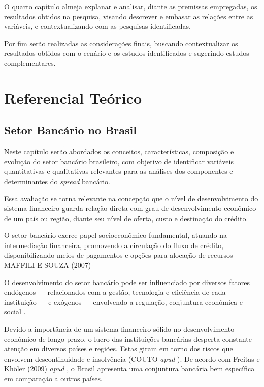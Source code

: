 \documentclass[12pt,12pt,openright,oneside,a4paper,chapter=TITLE,section=TITLE,subsection=TITLE,subsubsection=TITLE english,french,spanish,portugues,sumario=tradicional]{abntex2}
\begin{document}
O quarto capítulo almeja explanar e analisar, diante as premissas empregadas, os resultados obtidos na pesquisa, visando descrever e embasar as relações entre as variáveis, e contextualizando com as pesquisas identificadas.

Por fim serão realizadas as considerações finais, buscando contextualizar os resultados obtidos com o cenário e os estudos identificados e sugerindo estudos complementares.

\textual
\pagestyle{simple}

\chapter{Referencial Teórico}

\section{Setor Bancário no Brasil}

Neste capítulo serão abordados os conceitos, características, composição e
evolução do setor bancário brasileiro, com objetivo de identificar variáveis
quantitativas e qualitativas relevantes para as análises dos componentes e
determinantes do \emph{spread} bancário.

Essa avaliação se torna relevante na concepção que o nível de desenvolvimento
do sistema financeiro guarda relação direta com grau de desenvolvimento
econômico de um país ou região, diante seu nível de oferta, custo e destinação do crédito.

O setor bancário exerce papel socioeconômico fundamental, atuando na
intermediação financeira, promovendo a circulação do fluxo de crédito,
disponibilizando meios de pagamentos e opções para alocação de recursos MAFFILI
E SOUZA (2007)

O desenvolvimento do setor bancário pode ser influenciado por diversos fatores
endógenos --- relacionados com a gestão, tecnologia e eficiência de cada
instituição --- e exógenos --- envolvendo a regulação, conjuntura econômica e
social \cite{rover:2011}.

Devido a importância de um sistema financeiro sólido no desenvolvimento
econômico de longo prazo, o lucro das instituições bancárias desperta constante
atenção em diversos países e regiões. Estas giram em torno dos riscos que
envolvem descontinuidade e insolvência (COUTO \emph{apud} \cite{dantas:2012}). De
acordo com Freitas e Khöler (2009) \emph{apud} \textcite{dantas:2012}, o Brasil
apresenta uma conjuntura bancária bem específica em comparação a outros países.
\end{document}
